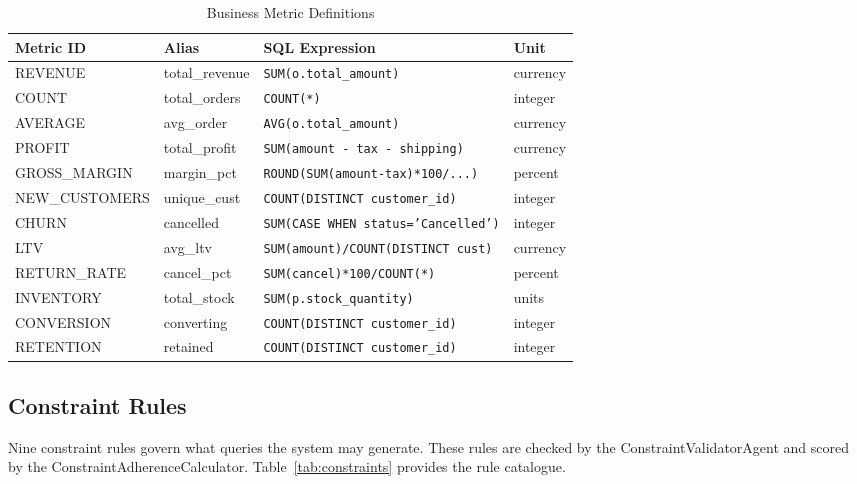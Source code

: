 \documentclass[12pt,a4paper]{report}
\begin{document}
\begin{table}[H]
  \centering
  \caption{Business Metric Definitions}
  \label{tab:metrics}
  \renewcommand{\arraystretch}{1.2}
  \begin{tabularx}{\textwidth}{@{}llXl@{}}
    \toprule
    \textbf{Metric ID} & \textbf{Alias} & \textbf{SQL Expression} & \textbf{Unit} \\
    \midrule
    REVENUE      & total\_revenue  & \texttt{SUM(o.total\_amount)}              & currency \\
    COUNT        & total\_orders   & \texttt{COUNT(*)}                         & integer \\
    AVERAGE      & avg\_order      & \texttt{AVG(o.total\_amount)}             & currency \\
    PROFIT       & total\_profit   & \texttt{SUM(amount - tax - shipping)}     & currency \\
    GROSS\_MARGIN & margin\_pct    & \texttt{ROUND(SUM(amount-tax)*100/...)}   & percent \\
    NEW\_CUSTOMERS & unique\_cust  & \texttt{COUNT(DISTINCT customer\_id)}     & integer \\
    CHURN        & cancelled      & \texttt{SUM(CASE WHEN status='Cancelled')} & integer \\
    LTV          & avg\_ltv       & \texttt{SUM(amount)/COUNT(DISTINCT cust)} & currency \\
    RETURN\_RATE & cancel\_pct    & \texttt{SUM(cancel)*100/COUNT(*)}         & percent \\
    INVENTORY    & total\_stock   & \texttt{SUM(p.stock\_quantity)}           & units \\
    CONVERSION   & converting     & \texttt{COUNT(DISTINCT customer\_id)}     & integer \\
    RETENTION    & retained       & \texttt{COUNT(DISTINCT customer\_id)}     & integer \\
    \bottomrule
  \end{tabularx}
\end{table}

\subsection{Constraint Rules}
\label{subsec:constraints}

Nine constraint rules govern what queries the system may generate. These rules are checked by the ConstraintValidatorAgent and scored by the ConstraintAdherenceCalculator. Table~\ref{tab:constraints} provides the rule catalogue.
\end{document}
